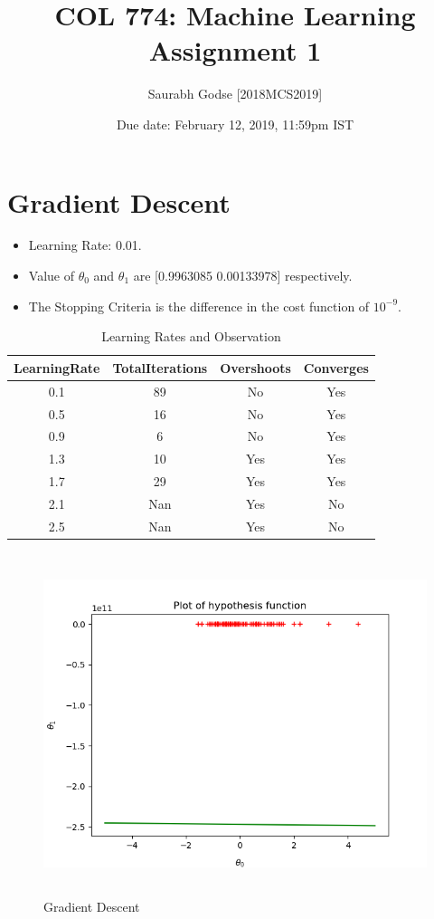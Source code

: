 \documentclass[10pt]{article}
\title{COL 774: Machine Learning Assignment 1}
\author {Saurabh Godse [2018MCS2019]}
\date{Due date: February 12, 2019, 11:59pm IST}
\begin{document}
\maketitle

\section{Gradient Descent}

\begin{itemize}
 \item Learning Rate: 0.01.
 \item Value of $\theta_0$ and $\theta_1$ are [0.9963085  0.00133978] respectively.
 \item The Stopping Criteria is the difference in the cost function of $10 ^ {-9} $.
\end{itemize}

\begin{table}[h!]
	\centering
	\begin{tabular}{||c|c|c|c||} 
 	\hline
 	LearningRate & TotalIterations & Overshoots & Converges \\ [0.5ex] 
 	\hline
 	0.1  & 89 & No & Yes \\ 
 	0.5 & 16 & No & Yes \\
 	0.9 & 6 & No & Yes \\
 	1.3 & 10 & Yes & Yes \\
 	1.7 & 29 & Yes & Yes \\ 
 	2.1 & Nan & Yes & No \\
 	2.5 & Nan & Yes & No \\ [1ex]
 	\hline
	\end{tabular}

	\caption{Learning Rates and Observation}
	\label{table:1}
\end{table}

\begin{figure}[H]
	\includegraphics[width = 15cm,height = 10cm]{Q1_b}
	\caption{Gradient Descent}
\end{figure}
\end{document}
